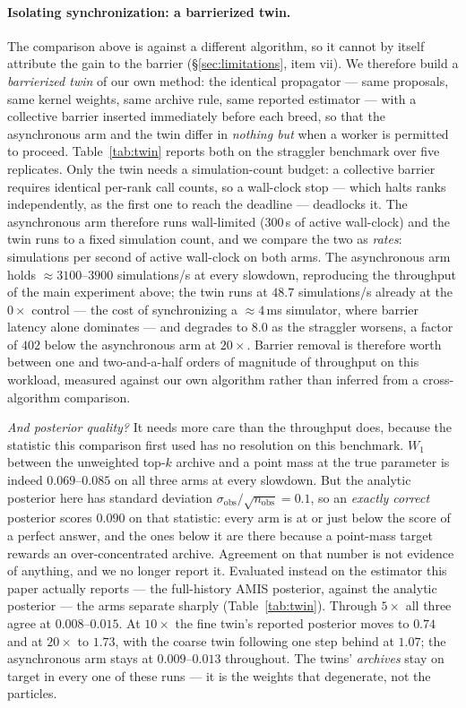 \paragraph{Isolating synchronization: a barrierized twin.} The comparison above is against a different algorithm, so it cannot by itself attribute the gain to the barrier (\S\ref{sec:limitations}, item vii). We therefore build a \emph{barrierized twin} of our own method: the identical propagator --- same proposals, same kernel weights, same archive rule, same reported estimator --- with a collective barrier inserted immediately before each breed, so that the asynchronous arm and the twin differ in \emph{nothing but} when a worker is permitted to proceed. Table~\ref{tab:twin} reports both on the straggler benchmark over five replicates. Only the twin needs a simulation-count budget: a collective barrier requires identical per-rank call counts, so a wall-clock stop --- which halts ranks independently, as the first one to reach the deadline --- deadlocks it. The asynchronous arm therefore runs wall-limited ($300$\,s of active wall-clock) and the twin runs to a fixed simulation count, and we compare the two as \emph{rates}: simulations per second of active wall-clock on both arms. The asynchronous arm holds $\approx3100$--$3900$ simulations/s at every slowdown, reproducing the throughput of the main experiment above; the twin runs at $48.7$ simulations/s already at the $0\times$ control --- the cost of synchronizing a $\approx4$\,ms simulator, where barrier latency alone dominates --- and degrades to $8.0$ as the straggler worsens, a factor of $402$ below the asynchronous arm at $20\times$. Barrier removal is therefore worth between one and two-and-a-half orders of magnitude of throughput on this workload, measured against our own algorithm rather than inferred from a cross-algorithm comparison.

\emph{And posterior quality?} It needs more care than the throughput does, because the statistic this comparison first used has no resolution on this benchmark. $W_1$ between the unweighted top-$k$ archive and a point mass at the true parameter is indeed $0.069$--$0.085$ on all three arms at every slowdown. But the analytic posterior here has standard deviation $\sigma_{\mathrm{obs}}/\sqrt{n_{\mathrm{obs}}} = 0.1$, so an \emph{exactly correct} posterior scores $0.090$ on that statistic: every arm is at or just below the score of a perfect answer, and the ones below it are there because a point-mass target rewards an over-concentrated archive. Agreement on that number is not evidence of anything, and we no longer report it. Evaluated instead on the estimator this paper actually reports --- the full-history AMIS posterior, against the analytic posterior --- the arms separate sharply (Table~\ref{tab:twin}). Through $5\times$ all three agree at $0.008$--$0.015$. At $10\times$ the fine twin's reported posterior moves to $0.74$ and at $20\times$ to $1.73$, with the coarse twin following one step behind at $1.07$; the asynchronous arm stays at $0.009$--$0.013$ throughout. The twins' \emph{archives} stay on target in every one of these runs --- it is the weights that degenerate, not the particles.

